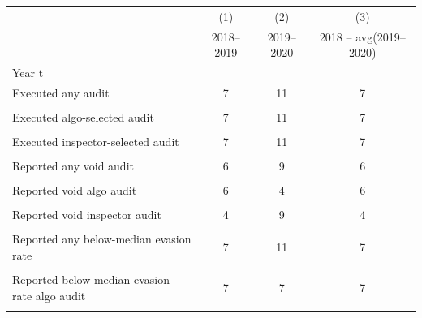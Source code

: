 {
\def\sym#1{\ifmmode^{#1}\else\(^{#1}\)\fi}
\begin{tabular}{l*{3}{c}}
\toprule
            &\multicolumn{1}{c}{(1)}&\multicolumn{1}{c}{(2)}&\multicolumn{1}{c}{(3)}\\
            &\multicolumn{1}{c}{2018–2019}&\multicolumn{1}{c}{2019–2020}&\multicolumn{1}{c}{2018 – avg(2019–2020)}\\
\midrule
Year t      &                     &                     &                     \\
Executed any audit&           7         &          11         &           7         \\
            &                     &                     &                     \\
Executed algo-selected audit&           7         &          11         &           7         \\
            &                     &                     &                     \\
Executed inspector-selected audit&           7         &          11         &           7         \\
            &                     &                     &                     \\
Reported any void audit&           6         &           9         &           6         \\
            &                     &                     &                     \\
Reported void algo audit&           6         &           4         &           6         \\
            &                     &                     &                     \\
Reported void inspector audit&           4         &           9         &           4         \\
            &                     &                     &                     \\
Reported any below-median evasion rate&           7         &          11         &           7         \\
            &                     &                     &                     \\
Reported below-median evasion rate algo audit&           7         &           7         &           7         \\
            &                     &                     &                     \\

\end{tabular}}
